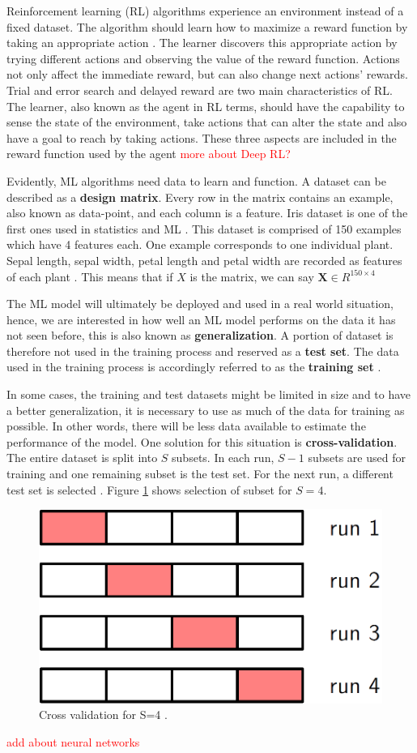 Reinforcement learning (RL) algorithms experience an environment instead of a fixed dataset. The algorithm should learn how to maximize a reward function by taking an appropriate action \cite{sutton1992introduction}. The learner discovers this appropriate action by trying different actions and observing the value of the reward function. Actions not only affect the immediate reward, but can also change next actions' rewards. Trial and error search and delayed reward are two main characteristics of RL.\\The learner, also known as the agent in RL terms, should have the capability to sense the state of the environment, take actions that can alter the state and also have a goal to reach by taking actions. These three aspects are included in the reward function used by the agent \cite{sutton1992introduction} \textcolor{red}{more about Deep RL?}

Evidently, ML algorithms need data to learn and function. A dataset can be described as a \textbf{design matrix}. Every row in the matrix contains an example, also known as data-point, and each column is a feature. Iris dataset is one of the first ones used in statistics and ML \cite{Fischer1936Iris}. This dataset is comprised of 150 examples which have 4 features each. One example corresponds to one individual plant. Sepal length, sepal width, petal length and petal width are recorded as features of each plant \cite{Fischer1936Iris}.
This means that if $X$ is the matrix, we can say $\mathbf{X} \in R^{150 \times 4}$

The ML model will ultimately be deployed and used in a real world situation, hence, we are interested in how well an ML model performs on the data it has not seen before, this is also known as \textbf{generalization}. A portion of dataset is therefore not used in the training process and reserved as a \textbf{test set}. The data used in the training process is accordingly referred to as the \textbf{training set} \cite{IanGoodfellow2016}. 

In some cases, the training and test datasets might be limited in size and to have a better generalization, it is necessary to use as much of the data for training as possible. In other words, there will be less data available to estimate the performance of the model. One solution for this situation is \textbf{cross-validation}. The entire dataset is split into ${S}$ subsets. In each run, ${S - 1}$ subsets are used for training and one remaining subset is the test set. For the next run, a different test set is selected \cite{bishop2006pattern}. Figure \ref{fig:crossv} shows selection of subset for ${S = 4}$.

\begin{figure}
    \includegraphics[width=0.5\linewidth ]{figures/crossv.png}
    \centering
    \caption{Cross validation for S=4 \cite{bishop2006pattern}.}
    \label{fig:crossv}
\end{figure}



\textcolor{red}{add about neural networks}\\